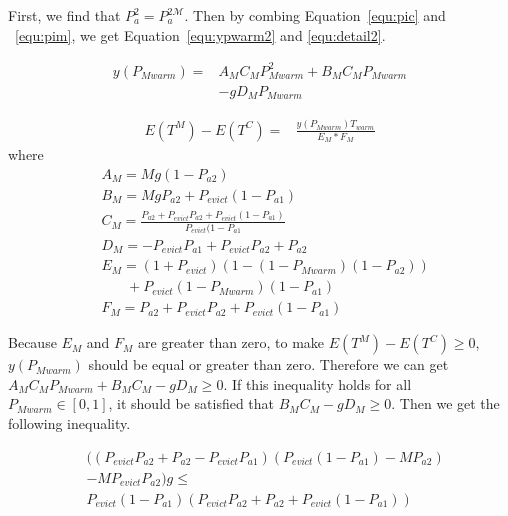 First, we find that $P_{a}^{\mathfrak{2}} = P_{a}^{\mathfrak{2}\mathcal{M}}$.
Then by combing Equation~\ref{equ:pic} and ~\ref{equ:pim}, we get Equation~\ref{equ:ypwarm2} and \ref{equ:detail2}.


\begin{equation}
\label{equ:ypwarm2}
\begin{split}
y(P_{Mwarm}) = & A_{M}C_{M}P_{Mwarm}^2+B_{M}C_{M}P_{Mwarm} \\
&-gD_{M}P_{Mwarm} \,
\end{split}\end{equation}

\begin{equation}
\label{equ:detail2}
\begin{split}
E(T^{M}) - E(T^{C}) = &\frac{y(P_{Mwarm})T_{warm}}{E_{M}*F_{M}}
\end{split}\end{equation}
where
\begin{equation*}
\begin{split}
&A_{M}= Mg(1-P_{a2})\\
&B_{M}=MgP_{a2}+P_{evict}(1-P_{a1})\\
&C_{M}=\frac{P_{a2}+P_{evict}P_{a2}+P_{evict}(1-P_{a1})}{P_{evict}(1-P_{a1}}\\
&D_{M}=-P_{evict}P_{a1}+P_{evict}P_{a2}+P_{a2}\\
&E_{M}=(1+P_{evict})(1-(1-P_{Mwarm})(1-P_{a2})) \\& \ \ \ \ \ \ \ \ +P_{evict}(1-P_{Mwarm})(1-P_{a1})\\
&F_{M}=P_{a2}+P_{evict}P_{a2}+P_{evict}(1-P_{a1})
\end{split}\end{equation*}

Because $E_{M}$ and $F_{M}$ are greater than zero, to make $E(T^{M}) - E(T^{C}) \geq 0$, $y(P_{Mwarm})$ should be equal or greater than zero.
Therefore we can get $ A_{M}C_{M}P_{Mwarm}+B_{M}C_{M}-gD_{M} \geq 0$.
If this inequality holds for all $P_{Mwarm} \in [0,1]$, it should be satisfied that $B_{M}C_{M}-gD_{M} \geq 0$.
Then we get the following inequality.

\begin{equation}
\label{equ:gcondition}
\begin{split}
&((P_{evict}P_{a2}+P_{a2}-P_{evict}P_{a1})(P_{evict}(1-P_{a1})-MP_{a2}) \\
&-MP_{evict}P_{a2})g \leq \\
&P_{evict}(1-P_{a1})(P_{evict}P_{a2}+P_{a2}+P_{evict}(1-P_{a1}))
\end{split}\end{equation}

